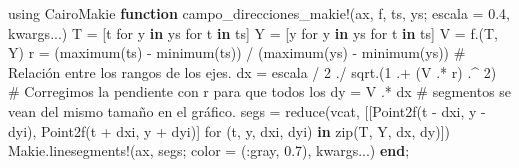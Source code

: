 \documentclass[
  spanish,
  a4paper,
]{scrreport}
\newenvironment{Shaded}{\begin{snugshade}}{\end{snugshade}}
\newcommand{\BuiltInTok}[1]{\textcolor[rgb]{0.00,0.23,0.31}{#1}}
\newcommand{\CommentTok}[1]{\textcolor[rgb]{0.37,0.37,0.37}{#1}}
\newcommand{\FloatTok}[1]{\textcolor[rgb]{0.68,0.00,0.00}{#1}}
\newcommand{\FunctionTok}[1]{\textcolor[rgb]{0.28,0.35,0.67}{#1}}
\newcommand{\ImportTok}[1]{\textcolor[rgb]{0.00,0.46,0.62}{#1}}
\newcommand{\KeywordTok}[1]{\textcolor[rgb]{0.00,0.23,0.31}{\textbf{#1}}}
\newcommand{\NormalTok}[1]{\textcolor[rgb]{0.00,0.23,0.31}{#1}}
\newcommand{\OperatorTok}[1]{\textcolor[rgb]{0.37,0.37,0.37}{#1}}
\theoremstyle{definition}
\theoremstyle{remark}
\begin{document}
\begin{Shaded}
\begin{Highlighting}[]
\ImportTok{using} \BuiltInTok{CairoMakie}
\KeywordTok{function} \FunctionTok{campo\_direcciones\_makie!}\NormalTok{(ax, f, ts, ys; escala }\OperatorTok{=} \FloatTok{0.4}\NormalTok{, kwargs}\OperatorTok{...}\NormalTok{)}
\NormalTok{    T }\OperatorTok{=}\NormalTok{ [t for y }\KeywordTok{in}\NormalTok{ ys for t }\KeywordTok{in}\NormalTok{ ts]}
\NormalTok{    Y }\OperatorTok{=}\NormalTok{ [y for y }\KeywordTok{in}\NormalTok{ ys for t }\KeywordTok{in}\NormalTok{ ts]}
\NormalTok{    V }\OperatorTok{=} \FunctionTok{f}\NormalTok{.(T, Y)}
\NormalTok{    r }\OperatorTok{=}\NormalTok{ (}\FunctionTok{maximum}\NormalTok{(ts) }\OperatorTok{{-}} \FunctionTok{minimum}\NormalTok{(ts)) }\OperatorTok{/}\NormalTok{ (}\FunctionTok{maximum}\NormalTok{(ys) }\OperatorTok{{-}} \FunctionTok{minimum}\NormalTok{(ys))  }\CommentTok{\# Relación entre los rangos de los ejes.}
\NormalTok{    dx }\OperatorTok{=}\NormalTok{ escala }\OperatorTok{/} \FloatTok{2} \OperatorTok{./} \FunctionTok{sqrt}\NormalTok{.(}\FloatTok{1} \OperatorTok{.+}\NormalTok{ (V }\OperatorTok{.*}\NormalTok{ r) }\OperatorTok{.\^{}} \FloatTok{2}\NormalTok{)  }\CommentTok{\# Corregimos la pendiente con r para que todos los}
\NormalTok{    dy }\OperatorTok{=}\NormalTok{ V }\OperatorTok{.*}\NormalTok{ dx                                  }\CommentTok{\# segmentos se vean del mismo tamaño en el gráfico.}
\NormalTok{    segs }\OperatorTok{=} \FunctionTok{reduce}\NormalTok{(vcat, [[}\FunctionTok{Point2f}\NormalTok{(t }\OperatorTok{{-}}\NormalTok{ dxi, y }\OperatorTok{{-}}\NormalTok{ dyi), }\FunctionTok{Point2f}\NormalTok{(t }\OperatorTok{+}\NormalTok{ dxi, y }\OperatorTok{+}\NormalTok{ dyi)]}
\NormalTok{                          for (t, y, dxi, dyi) }\KeywordTok{in} \FunctionTok{zip}\NormalTok{(T, Y, dx, dy)])}
\NormalTok{    Makie.}\FunctionTok{linesegments!}\NormalTok{(ax, segs; color }\OperatorTok{=}\NormalTok{ (}\OperatorTok{:}\NormalTok{gray, }\FloatTok{0.7}\NormalTok{), kwargs}\OperatorTok{...}\NormalTok{)}
\KeywordTok{end}\NormalTok{;}
\end{Highlighting}
\end{Shaded}
\end{document}

